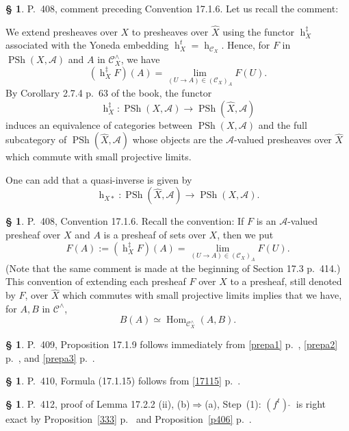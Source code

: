 \documentclass[12pt]{article}%
\theoremstyle{remark}
\theoremstyle{definition}
\newtheorem{s}[thm]{\S}%
\newcommand{\oo}{\operatorname}
\newcommand{\A}{\mathcal A}
\newcommand{\C}{\mathcal C}
\newcommand{\fthat}{(f^t)\ \widehat{}\ }
\newcommand{\then}{\Rightarrow}
\DeclareMathOperator{\Hom}{Hom}%
\begin{document}
%

\begin{s}\label{s408}
P.~408, comment preceding Convention 17.1.6. Let us recall the comment: 

We extend presheaves over $X$ to presheaves over $\widehat X$ using the functor $\oo h_X^\ddagger$ associated with the Yoneda embedding $\oo h_X^t=\oo h_{\C_X}$. Hence, for $F$ in $\oo{PSh}(X,\A)$ and $A$ in $\C_X^\wedge$, we have 
$$
(\oo h_X^\ddagger F)(A)=\lim_{(U\to A)\in(\C_X)_A}F(U).
$$ 
By Corollary 2.7.4 p.~63 of the book, the functor 
$$
\oo h_X^\ddagger:\oo{PSh}(X,\A)\to\oo{PSh}(\widehat X,\A)
$$ 
induces an equivalence of categories between $\oo{PSh}(X,\A)$ and the full subcategory of $\oo{PSh}(\widehat X,\A)$ whose objects are the $\A$-valued presheaves over $\widehat X$ which commute with small projective limits. 

One can add that a quasi-inverse is given by 
$$
\oo h_{X*}:\oo{PSh}(\widehat X,\A)\to\oo{PSh}(X,\A). 
$$ 
\end{s}

%

\begin{s}
P.~408, Convention 17.1.6. Recall the convention: If $F$ is an $\A$-valued presheaf over $X$ and $A$ is a presheaf of sets over $X$, then we put 
\begin{equation}\label{408}
F(A):=(\oo h_X^\ddagger F)(A)=\lim_{(U\to A)\in(\C_X)_A}F(U).
\end{equation}
(Note that the same comment is made at the beginning of Section 17.3 p.~414.) This convention of extending each presheaf $F$ over $X$ to a presheaf, still denoted by $F$, over $\widehat X$ which commutes with small projective limits implies that we have, for $A,B$ in $\C^\wedge$, 
$$
B(A)\simeq\Hom_{\C_X^\wedge}(A,B).
$$
\end{s}

%

\begin{s}\label{prepa5}
P.~409, Proposition 17.1.9 follows immediately from \eqref{prepa1} p.~\pageref{prepa1}, \eqref{prepa2} p.~\pageref{prepa2}, and \eqref{prepa3} p.~\pageref{prepa3}.
\end{s}

%

\begin{s}\label{17115b}
P.~410, Formula (17.1.15) follows from \eqref{17115} p.~\pageref{17115}.
\end{s}

%

\begin{s}
P.~412, proof of Lemma 17.2.2 (ii), (b)$\then$(a), Step~(1): $\fthat$ is right exact by Proposition~\ref{333} p.~\pageref{333} and Proposition~\ref{p406} p.~\pageref{p406}.
\end{s}
\end{document}
